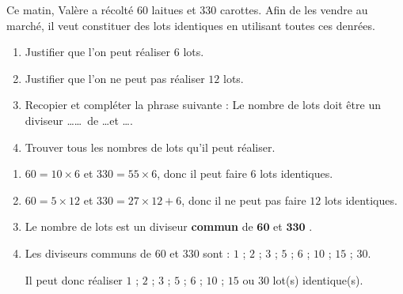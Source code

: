 \begin{exercice*}
    Ce matin, Valère a récolté $60$ laitues et $330$ carottes. Afin de les vendre au marché, il veut
constituer des lots identiques en utilisant toutes ces denrées.
    \begin{enumerate}
        \item Justifier que l'on peut réaliser $6$ lots.
        \item Justifier que l'on ne peut pas réaliser $12$ lots.
        \item Recopier et compléter la phrase suivante : \og Le nombre de lots doit être un diviseur \dots\dots~de \dots et \dots .\fg
        \item Trouver tous les nombres de lots qu'il peut réaliser.
    \end{enumerate}

\end{exercice*}
\begin{corrige}
    \begin{enumerate}
        \item $60 = 10\times 6$ et $330 = 55\times 6$, donc il peut faire $6$ lots identiques.
        \item $60 = 5\times 12$ et $330 = 27\times 12 + 6$, donc il ne peut pas faire $12$ lots identiques.        
        \item \og Le nombre de lots est un diviseur \textbf{commun} de $\mathbf{60}$ et $\mathbf{330}$ .\fg
        \item Les diviseurs communs de $60$ et $330$ sont : $1$ ; $2$ ; $3$ ; $5$ ; $6$ ; $10$ ; $15$ ; $30$.
        
        Il peut donc réaliser $1$ ; $2$ ; $3$ ; $5$ ; $6$ ; $10$ ; $15$ ou $30$ lot(s) identique(s).
    \end{enumerate}
\end{corrige}

